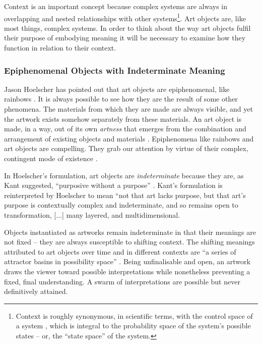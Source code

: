 \documentclass[letterpaper]{article}
\begin{document}
    Context is an important concept because complex systems are always in overlapping and nested relationships with other systems\footnote{
        Context is roughly synonymous, in scientific terms, with the control space of a system \citep[p.130]{DeLandaAssmblgThry2016}, which is integral to the probability space of the system's possible states – or, the “state space” of the system.
    }. Art objects are, like most things, complex systems. In order to think about the way art objects fulfil their purpose of embodying meaning it will be necessary to examine how they function in relation to their context.
    
    \subsubsection{Epiphenomenal Objects with Indeterminate Meaning}

    Jason Hoelscher has pointed out that art objects are epiphenomenal, like rainbows \citep[p.17]{HoelscherArtAsInfrmtn2021}. It is always possible to see how they are the result of some other phenomena. The materials from which they are made are always visible, and yet the artwork exists somehow separately from these materials. An art object is made, in a way, out of its own \emph{artness} that emerges from the combination and arrangement of existing objects and materials \citep[p.2]{HoelscherThPtcsOfPhsSpc2014}. Epiphenomena like rainbows and art objects are compelling. They grab our attention by virtue of their complex, contingent mode of existence \citep[p.18]{HoelscherThPtcsOfPhsSpc2014}. 
    
    In Hoelscher's formulation, art objects are \emph{indeterminate} because they are, as Kant suggested, “purposive without a purpose” \citep[p.57]{KantCrtqOfJdgmnt}. Kant's formulation is reinterpreted by Hoelscher to mean “not that art lacks purpose, but that art's purpose is contextually complex and indeterminate, and so remains open to transformation, [...] many layered, and multidimensional.\citep[p.25]{HoelscherThPtcsOfPhsSpc2014}

    Objects instantiated as artworks remain indeterminate in that their meanings are not fixed – they are always susceptible to shifting context. The shifting meanings attributed to art objects over time and in different contexts are “a series of attractor basins in possibility space” \citep[p.4]{HoelscherThPtcsOfPhsSpc2014}. Being unfinalisable and open, an artwork draws the viewer toward possible interpretations while nonetheless preventing a fixed, final understanding. A swarm of interpretations are possible but never definitively attained. \citep[p.12]{HoelscherThPtcsOfPhsSpc2014}
\end{document}
